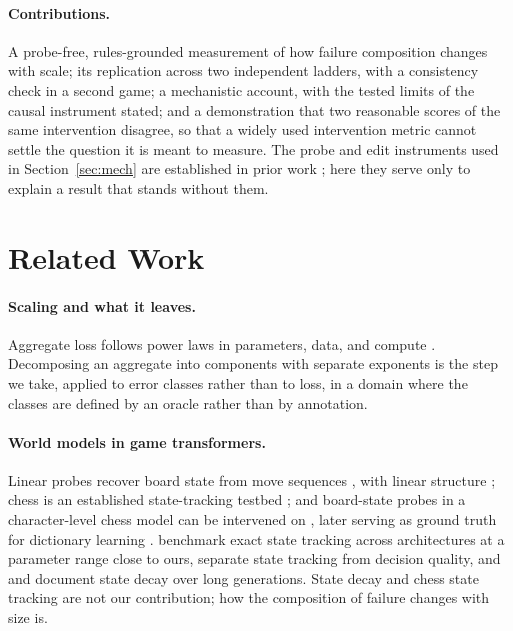 \documentclass[11pt]{article}
\newcommand{\priorp}{\citep{rathore2026coherent}}
\begin{document}
\paragraph{Contributions.}
A probe-free, rules-grounded measurement of how failure composition changes with
scale; its replication across two independent ladders, with a consistency check in a
second game; a mechanistic account,
with the tested limits of the causal instrument stated; and a demonstration
that two reasonable scores of the same intervention disagree, so that a widely used
intervention metric cannot settle the question it is
meant to measure. The probe and edit instruments used in Section~\ref{sec:mech}
are established in prior work \priorp; here they serve only to
explain a result that stands without them.

\section{Related Work}

\paragraph{Scaling and what it leaves.}
Aggregate loss follows power laws in parameters, data, and compute
\citep{kaplan2020scaling,hoffmann2022training}. Decomposing an aggregate into
components with separate exponents is the step we take, applied to error classes
rather than to loss, in a domain where the classes are defined by an oracle
rather than by annotation.

\paragraph{World models in game transformers.}
Linear probes recover board state from move sequences \citep{li2023emergent},
with linear structure \citep{nanda2023emergent}; chess is an established
state-tracking testbed \citep{toshniwal2022chess}; and board-state probes in a
character-level chess model can be intervened on \citep{karvonen2024emergent},
later serving as ground truth for dictionary learning \citep{karvonen2024measuring}.
\citet{walker2026chess} benchmark exact state tracking across architectures at a
parameter range close to ours, \citet{li2026tracking} separate state tracking from
decision quality, and \citet{pereira2026transformers} and
\citet{harang2025tracking} document state decay over long generations. State
decay and chess state tracking are not our contribution; how the composition of
failure changes with size is.
\end{document}
